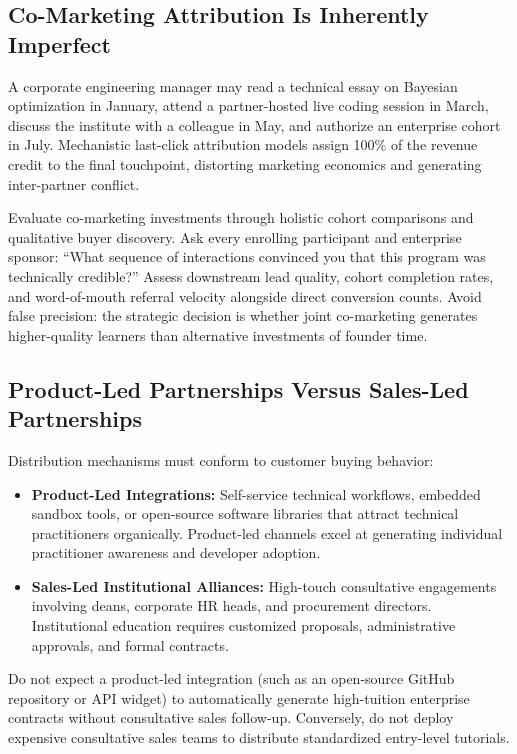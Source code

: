 \subsection{Co-Marketing Attribution Is Inherently Imperfect}
\label{sec:co_marketing_attribution_imperfections}

A corporate engineering manager may read a technical essay on Bayesian optimization in January, attend a partner-hosted live coding session in March, discuss the institute with a colleague in May, and authorize an enterprise cohort in July. Mechanistic last-click attribution models assign 100\% of the revenue credit to the final touchpoint, distorting marketing economics and generating inter-partner conflict.

Evaluate co-marketing investments through holistic cohort comparisons and qualitative buyer discovery. Ask every enrolling participant and enterprise sponsor: ``What sequence of interactions convinced you that this program was technically credible?'' Assess downstream lead quality, cohort completion rates, and word-of-mouth referral velocity alongside direct conversion counts. Avoid false precision: the strategic decision is whether joint co-marketing generates higher-quality learners than alternative investments of founder time.

\subsection{Product-Led Partnerships Versus Sales-Led Partnerships}
\label{sec:product_led_versus_sales_led_alliances}

Distribution mechanisms must conform to customer buying behavior:
\begin{itemize}
\item \textbf{Product-Led Integrations:} Self-service technical workflows, embedded sandbox tools, or open-source software libraries that attract technical practitioners organically. Product-led channels excel at generating individual practitioner awareness and developer adoption.
\item \textbf{Sales-Led Institutional Alliances:} High-touch consultative engagements involving deans, corporate HR heads, and procurement directors. Institutional education requires customized proposals, administrative approvals, and formal contracts.
\end{itemize}
Do not expect a product-led integration (such as an open-source GitHub repository or API widget) to automatically generate high-tuition enterprise contracts without consultative sales follow-up. Conversely, do not deploy expensive consultative sales teams to distribute standardized entry-level tutorials.

